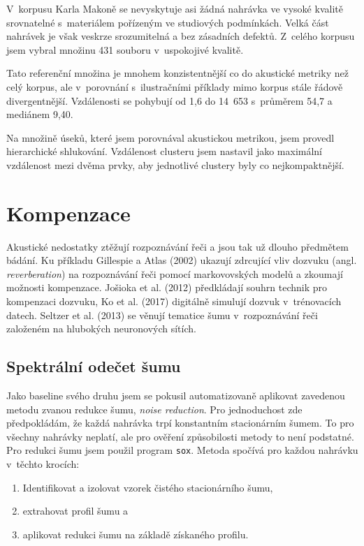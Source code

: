 V~korpusu Karla Makoně se nevyskytuje asi žádná nahrávka ve vysoké kvalitě
srovnatelné s~materiálem pořízeným ve studiových podmínkách. Velká část
nahrávek je však veskrze srozumitelná a bez zásadních defektů. Z~celého korpusu jsem
vybral množinu 431 souboru v~uspokojivé kvalitě.

Tato referenční množina je mnohem konzistentnější co do akustické metriky než
celý korpus, ale v~porovnání s~ilustračními příklady mimo korpus stále řádově
divergentnější. Vzdálenosti se pohybují od 1,6 do 14~653 s~průměrem  54,7 a
mediánem 9,40.

Na množině úseků, které jsem porovnával akustickou metrikou, jsem provedl
hierarchické shlukování\cite{johnson1967hierarchical}. Vzdálenost clusteru jsem nastavil jako maximální
vzdálenost mezi dvěma prvky, aby jednotlivé clustery byly co nejkompaktnější.

\section{Kompenzace}
\label{sec:akustika:kompenzace}

Akustické nedostatky ztěžují rozpoznávání řeči a jsou tak už dlouho předmětem
bádání. Ku příkladu Gillespie a Atlas (2002)\cite{gillespie2002diversity} ukazují
zdrcující vliv dozvuku (angl. {\em reverberation}) na rozpoznávání řeči pomocí
markovovských modelů a zkoumají možnosti kompenzace. Jošioka et
al. (2012)\cite{reverbmagazine} předkládají souhrn technik pro kompenzaci dozvuku, Ko
et al. (2017)\cite{reverbaugment} digitálně simulují dozvuk v~trénovacích datech.
Seltzer et al. (2013)\cite{dnnnoiserobust} se věnují tematice šumu v~rozpoznávání řeči
založeném na hlubokých neuronových sítích.

\subsection{Spektrální odečet šumu}

Jako baseline svého druhu jsem se pokusil automatizovaně aplikovat zavedenou
metodu zvanou redukce šumu, \textit{noise reduction}. Pro jednoduchost zde
předpokládám, že každá nahrávka trpí konstantním stacionárním šumem. To pro
všechny nahrávky neplatí, ale pro ověření způsobilosti metody to není podstatné.
Pro redukci šumu jsem použil program \texttt{sox}. Metoda spočívá pro každou
nahrávku v~těchto krocích:
\begin{enumerate}
\item{Identifikovat a izolovat vzorek čistého stacionárního šumu,}
\item{extrahovat profil šumu a}
\item{aplikovat redukci šumu na základě získaného profilu.}
\end{enumerate}

